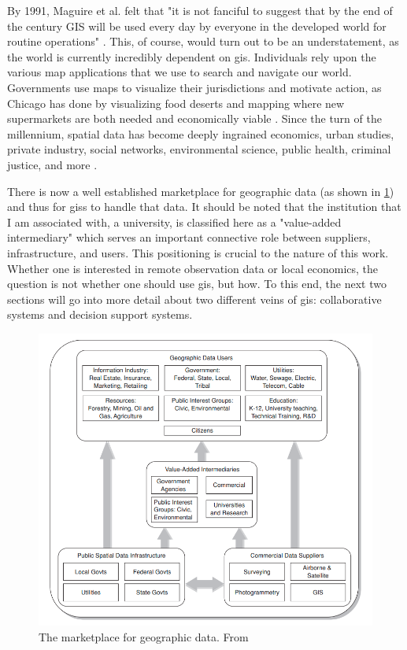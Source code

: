 By 1991, Maguire et al. felt that "it is not fanciful to suggest that by the end of the century GIS will be used every day by everyone in the developed world for routine operations" \cite{maguireGeographicalInformationSystems1991}. This, of course, would turn out to be an understatement, as the world is currently incredibly dependent on \ac{gis}. Individuals rely upon the various map applications that we use to search and navigate our world. Governments use maps to visualize their jurisdictions and motivate action, as Chicago has done by visualizing food deserts and mapping where new supermarkets are both needed and economically viable \cite{goldsmithResponsiveCityEngaging2014}. Since the turn of the millennium, spatial data has become deeply ingrained economics, urban studies, private industry, social networks, environmental science, public health, criminal justice, and more \cite{goodchildSpatiallyIntegratedSocial2000}.

There is now a well established marketplace for geographic data (as shown in \ref{fig:marketplace}) and thus for \acp{gis} to handle that data. It should be noted that the institution that I am associated with, a university, is classified here as a "value-added intermediary" which serves an important connective role between suppliers, infrastructure, and users. This positioning is crucial to the nature of this work. Whether one is interested in remote observation data or local economics, the question is not whether one should use \ac{gis}, but how. To this end, the next two sections will go into more detail about two different veins of \ac{gis}: collaborative systems and decision support systems.

\begin{figure}[h]
	\centering
	\includegraphics[scale=0.4]{Figures/chap2/GISMarketplace.png}
	\caption[The marketplace for geographic data]{The marketplace for geographic data. From \cite{cowenAvailabilityGeographicData2007}}
	\label{fig:marketplace}
\end{figure}

